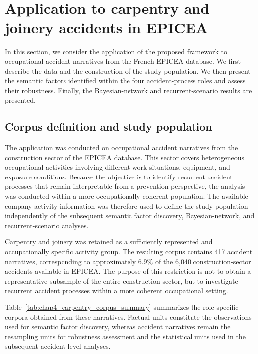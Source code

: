 \section{Application to carpentry and joinery accidents in EPICEA}
\label{sec:chap4_application_carpentry}

In this section, we consider the application of the proposed framework to occupational accident narratives from the French EPICEA database. We first describe the data and the construction of the study population. We then present the semantic factors identified within the four accident-process roles and assess their robustness. Finally, the Bayesian-network and recurrent-scenario results are presented.

\subsection{Corpus definition and study population}
\label{sec:chap4_carpentry_corpus}

The application was conducted on occupational accident narratives from the
construction sector of the EPICEA database. This sector covers heterogeneous
occupational activities involving different work situations, equipment, and
exposure conditions. Because the objective is to identify recurrent accident
processes that remain interpretable from a prevention perspective, the analysis
was conducted within a more occupationally coherent population. The available
company activity information was therefore used to define the study population
independently of the subsequent semantic factor discovery, Bayesian-network,
and recurrent-scenario analyses.

Carpentry and joinery was retained as a sufficiently represented and
occupationally specific activity group. The resulting corpus contains
417 accident narratives, corresponding to approximately 6.9\% of the
6,040 construction-sector accidents available in EPICEA. The purpose of this
restriction is not to obtain a representative subsample of the entire
construction sector, but to investigate recurrent accident processes within
a more coherent occupational setting.

Table~\ref{tab:chap4_carpentry_corpus_summary} summarizes the role-specific
corpora obtained from these narratives. Factual units constitute the
observations used for semantic factor discovery, whereas accident narratives
remain the resampling units for robustness assessment and the statistical
units used in the subsequent accident-level analyses.


